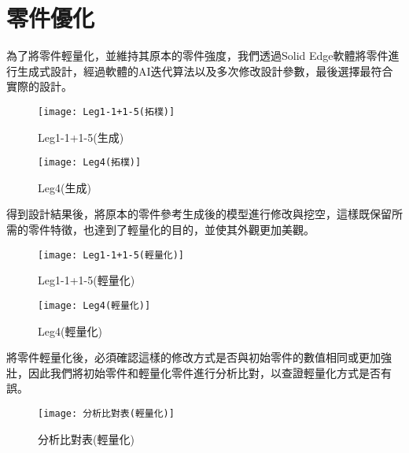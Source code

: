 \section{零件優化}
為了將零件輕量化，並維持其原本的零件強度，我們透過Solid Edge軟體將零件進行生成式設計，經過軟體的AI迭代算法以及多次修改設計參數，最後選擇最符合實際的設計。\

\begin{figure}[htbp]
  \centering
  \begin{minipage}{0.45\textwidth}
    \centering
    \texttt{[image: Leg1-1+1-5(拓樸)]}
    \caption{Leg1-1+1-5(生成)}
    \label{Leg1-1+1-5(拓樸)}
  \end{minipage}
  \hfill
  \begin{minipage}{0.45\textwidth}
    \centering
    \texttt{[image: Leg4(拓樸)]}
    \caption{Leg4(生成)}
    \label{Leg4(拓樸)}
  \end{minipage}
  \end{figure}

得到設計結果後，將原本的零件參考生成後的模型進行修改與挖空，這樣既保留所需的零件特徵，也達到了輕量化的目的，並使其外觀更加美觀。\

\begin{figure}[htbp]
  \centering
  \begin{minipage}{0.45\textwidth}
    \centering
    \texttt{[image: Leg1-1+1-5(輕量化)]}
    \caption{Leg1-1+1-5(輕量化)}
    \label{Leg1-1+1-5(輕量化)}
  \end{minipage}
  \hfill
  \begin{minipage}{0.45\textwidth}
    \centering
    \texttt{[image: Leg4(輕量化)]}
    \caption{Leg4(輕量化)}
    \label{Leg4(輕量化)}
  \end{minipage}
  \end{figure}

將零件輕量化後，必須確認這樣的修改方式是否與初始零件的數值相同或更加強壯，因此我們將初始零件和輕量化零件進行分析比對，以查證輕量化方式是否有誤。\

\begin{figure}[hbt!]
\center
\texttt{[image: 分析比對表(輕量化)]}
\caption{\Large 分析比對表(輕量化)}
\label{分析比對表(輕量化)}
\end{figure}

\begin{table}[htb!]
  \center\large
  \caption{\Large leg1-1+1-5分析比對}
\end{table}

\begin{table}[htb!]
  \center\large
  \caption{\Large leg4分析比對}
\end{table}
\newpage

